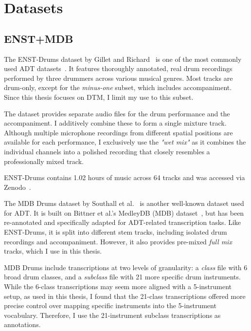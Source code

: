 \chapter{Datasets}\label{Datasets}

\section{ENST+MDB}

The ENST-Drums dataset by Gillet and Richard~\cite{gillet2006enst} is one of the most commonly used \gls{ADT} datasets~\cite{8350302}. It features thoroughly annotated, real drum recordings performed by three drummers across various musical genres. Most tracks are drum-only, except for the \textit{minus-one} subset, which includes accompaniment. Since this thesis focuses on \gls{DTM}, I limit my use to this subset.

The dataset provides separate audio files for the drum performance and the accompaniment. I additively combine these to form a single mixture track. Although multiple microphone recordings from different spatial positions are available for each performance, I exclusively use the \textit{"wet mix"} as it combines the individual channels into a polished recording that closely resembles a professionally mixed track.

ENST-Drums contains 1.02 hours of music across 64 tracks and was accessed via Zenodo~\cite{gillet_2006_7432188}.

The MDB Drums dataset by Southall et al.~\cite{southall2017mdb} is another well-known dataset used for \gls{ADT}. It is built on Bittner et al.'s MedleyDB (MDB) dataset~\cite{bittner2014medleydb}, but has been re-annotated and specifically adapted for \gls{ADT}-related transcription tasks. Like ENST-Drums, it is split into different stem tracks, including isolated drum recordings and accompaniment. However, it also provides pre-mixed \textit{full mix} tracks, which I use in this thesis.

MDB Drums include transcriptions at two levels of granularity: a \textit{class} file with 6 broad drum classes, and a \textit{subclass} file with 21 more specific drum instruments. While the 6-class transcriptions may seem more aligned with a 5-instrument setup, as used in this thesis, I found that the 21-class transcriptions offered more precise control over mapping specific instruments into the 5-instrument vocabulary. Therefore, I use the 21-instrument subclass transcriptions as annotations.

